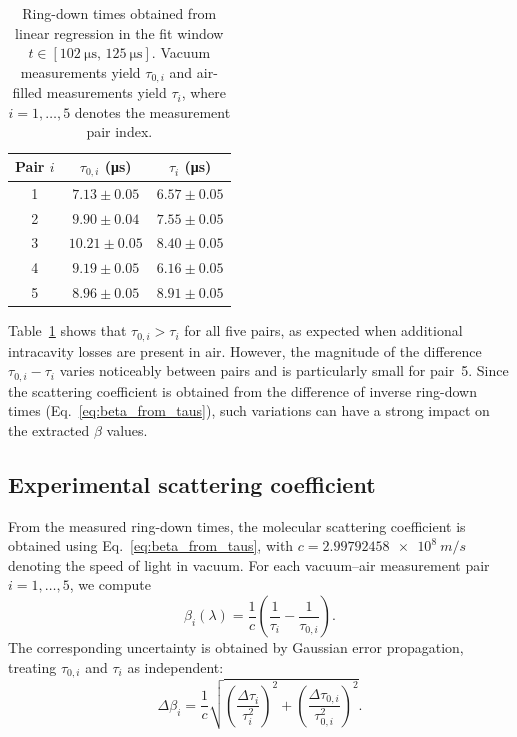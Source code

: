 \documentclass[a4paper]{article}
\begin{document}
\vspace{1em}
\begin{table}[H]
\centering
\caption{Ring-down times obtained from linear regression in the fit window $t\in[\SI{102}{\micro\second},\,\SI{125}{\micro\second}]$.
Vacuum measurements yield $\tau_{0,i}$ and air-filled measurements yield $\tau_i$, where $i=1,\dots,5$ denotes the measurement pair index.}
\label{tab:taus_all}
\begin{tabular}{c c c}
\toprule
Pair $i$ & $\tau_{0,i}$ (\si{\micro\second}) & $\tau_{i}$ (\si{\micro\second}) \\
\midrule
1 & $7.13 \pm 0.05$ & $6.57 \pm 0.05$ \\
2 & $9.90 \pm 0.04$ & $7.55 \pm 0.05$ \\
3 & $10.21 \pm 0.05$ & $8.40 \pm 0.05$ \\
4 & $9.19 \pm 0.05$ & $6.16 \pm 0.05$ \\
5 & $8.96 \pm 0.05$ & $8.91 \pm 0.05$ \\
\bottomrule
\end{tabular}
\end{table}

Table~\ref{tab:taus_all} shows that $\tau_{0,i}>\tau_i$ for all five pairs, as expected when additional intracavity losses are present in air.
However, the magnitude of the difference $\tau_{0,i}-\tau_i$ varies noticeably between pairs and is particularly small for pair~5.
Since the scattering coefficient is obtained from the difference of inverse ring-down times (Eq.~\eqref{eq:beta_from_taus}), such variations can have a strong impact on the extracted $\beta$ values.

\subsection{Experimental scattering coefficient}
\label{sec:evaluation_beta_exp}

From the measured ring-down times, the molecular scattering coefficient is obtained using Eq.~\eqref{eq:beta_from_taus}, with $c=\SI{2.99792458e8}{m/s}$ denoting the speed of light in vacuum.
For each vacuum--air measurement pair $i=1,\dots,5$, we compute
\[
\beta_i(\lambda)=\frac{1}{c}\left(\frac{1}{\tau_i}-\frac{1}{\tau_{0,i}}\right).
\]
The corresponding uncertainty is obtained by Gaussian error propagation, treating $\tau_{0,i}$ and $\tau_i$ as independent:
\[
\Delta\beta_i=\frac{1}{c}\sqrt{\left(\frac{\Delta\tau_i}{\tau_i^{2}}\right)^{2}+\left(\frac{\Delta\tau_{0,i}}{\tau_{0,i}^{2}}\right)^{2}}.
\]
\end{document}
